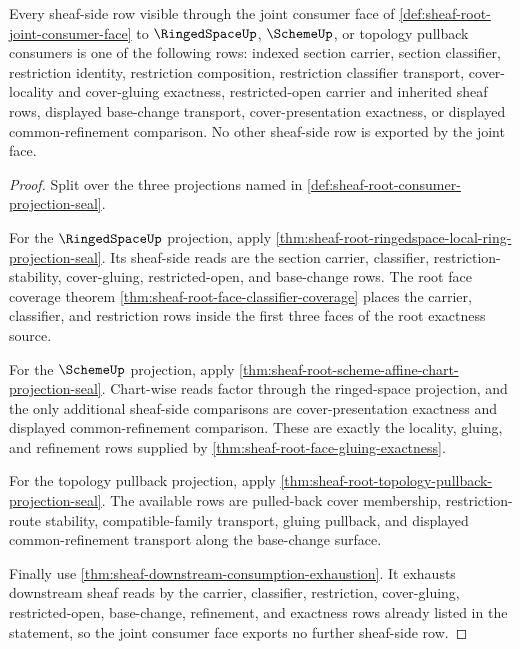 \begin{theorem}
\label{thm:sheaf-root-joint-consumer-face-exhaustion}
Every sheaf-side row visible through the joint consumer face of \autoref{def:sheaf-root-joint-consumer-face} to $\RingedSpaceUp$, $\SchemeUp$, or topology pullback consumers is one of the following rows: indexed section carrier, section classifier, restriction identity, restriction composition, restriction classifier transport, cover-locality and cover-gluing exactness, restricted-open carrier and inherited sheaf rows, displayed base-change transport, cover-presentation exactness, or displayed common-refinement comparison. No other sheaf-side row is exported by the joint face.
\end{theorem}
\begin{proof}
Split over the three projections named in \autoref{def:sheaf-root-consumer-projection-seal}.

For the $\RingedSpaceUp$ projection, apply \autoref{thm:sheaf-root-ringedspace-local-ring-projection-seal}. Its sheaf-side reads are the section carrier, classifier, restriction-stability, cover-gluing, restricted-open, and base-change rows. The root face coverage theorem \autoref{thm:sheaf-root-face-classifier-coverage} places the carrier, classifier, and restriction rows inside the first three faces of the root exactness source.

For the $\SchemeUp$ projection, apply \autoref{thm:sheaf-root-scheme-affine-chart-projection-seal}. Chart-wise reads factor through the ringed-space projection, and the only additional sheaf-side comparisons are cover-presentation exactness and displayed common-refinement comparison. These are exactly the locality, gluing, and refinement rows supplied by \autoref{thm:sheaf-root-face-gluing-exactness}.

For the topology pullback projection, apply \autoref{thm:sheaf-root-topology-pullback-projection-seal}. The available rows are pulled-back cover membership, restriction-route stability, compatible-family transport, gluing pullback, and displayed common-refinement transport along the base-change surface.

Finally use \autoref{thm:sheaf-downstream-consumption-exhaustion}. It exhausts downstream sheaf reads by the carrier, classifier, restriction, cover-gluing, restricted-open, base-change, refinement, and exactness rows already listed in the statement, so the joint consumer face exports no further sheaf-side row.
\end{proof}

